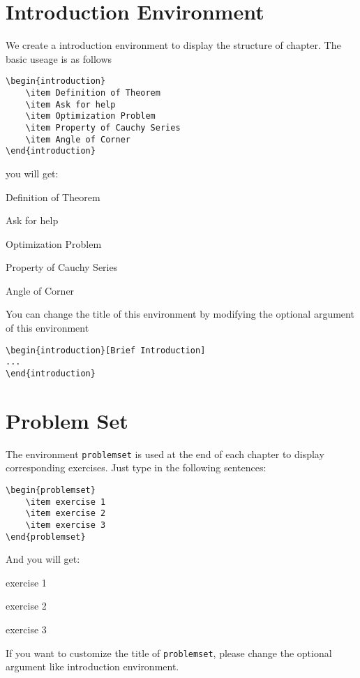 \documentclass[fancy,blue,11pt]{elegantbook}
\begin{document}
\section{Introduction Environment}
We create a introduction environment to display the structure of chapter. The basic useage is as follows
\begin{lstlisting}
\begin{introduction}
	\item Definition of Theorem
	\item Ask for help
	\item Optimization Problem
	\item Property of Cauchy Series
	\item Angle of Corner
\end{introduction}
\end{lstlisting}
you will get:
\begin{introduction}
	\item Definition of Theorem
	\item Ask for help
	\item Optimization Problem
	\item Property of Cauchy Series
	\item Angle of Corner
\end{introduction}

You can change the title of this environment by modifying the optional argument of this environment
\begin{lstlisting}
\begin{introduction}[Brief Introduction]
...
\end{introduction}
\end{lstlisting}

\section{Problem Set}
The environment \lstinline{problemset} is used at the end of each chapter to display corresponding exercises. Just type in the following sentences:
\begin{lstlisting}
\begin{problemset}
	\item exercise 1
	\item exercise 2
	\item exercise 3
\end{problemset}
\end{lstlisting}
And you will get:
\begin{problemset}
	\item exercise 1
	\item exercise 2
	\item exercise 3
\end{problemset}
\begin{remark}
If you want to customize the title of  \lstinline{problemset}, please change the optional argument like introduction environment.
\end{remark}
\end{document}
